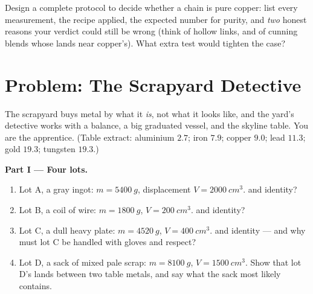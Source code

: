 \begin{exercise}[$\star\star\star$]\label{exo:g7:volume-mass-density:12}
Design a complete protocol to decide whether a chain is pure
copper: list every measurement, the recipe applied, the expected
number for purity, and \emph{two} honest reasons your verdict
could still be wrong (think of hollow links, and of cunning
blends whose  lands near copper's). What extra test would
tighten the case?
\end{exercise}

\section{Problem: The Scrapyard Detective}

\begin{problem}\label{pb:g7:volume-mass-density:1}
The scrapyard buys metal by what it \emph{is}, not what it looks
like, and the yard's detective works with a balance, a big
graduated vessel, and the skyline table. You are the apprentice.
(Table extract: aluminium $2.7$; iron $7.9$; copper $9.0$; lead
$11.3$; gold $19.3$; tungsten $19.3$.)

\medskip\noindent\textbf{Part I --- Four lots.}
\begin{enumerate}
  \item Lot A, a gray ingot: $m = \qty{5400}{g}$, displacement
        $V = \qty{2000}{cm^3}$.  and identity?
  \item Lot B, a coil of wire: $m = \qty{1800}{g}$,
        $V = \qty{200}{cm^3}$.  and identity?
  \item Lot C, a dull heavy plate: $m = \qty{4520}{g}$,
        $V = \qty{400}{cm^3}$.  and identity --- and why
        must lot C be handled with gloves and respect?
  \item Lot D, a sack of mixed pale scrap: $m = \qty{8100}{g}$,
        $V = \qty{1500}{cm^3}$. Show that lot D's  lands
        between two table metals, and say what the sack most
        likely contains.
\end{enumerate}


\end{problem}
